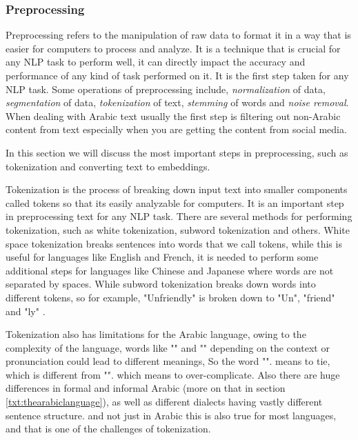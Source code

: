 \documentclass[12pt]{diazessay}
\newcounter{subsubsubsection}[subsubsection]
\begin{document}
        
        \subsubsection{Preprocessing}
            Preprocessing refers to the manipulation of raw data to format it in a way that is easier for computers to process and analyze. It is a technique that is crucial for any NLP task to perform well, it can directly impact the accuracy and performance of any kind of task performed on it. It is the first step taken for any NLP task. Some operations of preprocessing include, \emph{normalization} of data, \emph{segmentation} of data, \emph{tokenization} of text, \emph{stemming} of words and \emph{noise removal}. When dealing with Arabic text usually the first step is filtering out non-Arabic content from text especially when you are getting the content from social media.
            
            In this section we will discuss the most important steps in preprocessing, such as tokenization and converting text to embeddings.


             \label{txt:tokenization_section}
            Tokenization is the process of breaking down input text into smaller components called tokens so that its easily analyzable for computers. It is an important step in preprocessing text for any NLP task. There are several methods for performing tokenization, such as white tokenization, subword tokenization and others. White space tokenization breaks sentences into words that we call tokens, while this is useful for languages like English and French, it is needed to perform some additional steps for languages like Chinese and Japanese where words are not separated by spaces. While subword tokenization breaks down words into different tokens, so for example, "Unfriendly" is broken down to "Un", "friend" and "ly" \cite{subword_tokenization}.
            
            Tokenization also has limitations for the Arabic language, owing to the complexity of the language, words like "" and "" depending on the context or pronunciation could lead to different meanings, So the word
            "".
            means to tie, which is different from
            "".
            which means to over-complicate.
            Also there are huge differences in formal and informal Arabic (more on that in section \ref{txt:thearabiclanguage}), as well as different dialects having vastly different sentence structure. and not just in Arabic this is also true for most languages, and that is one of the challenges of tokenization.
    
\end{document}
